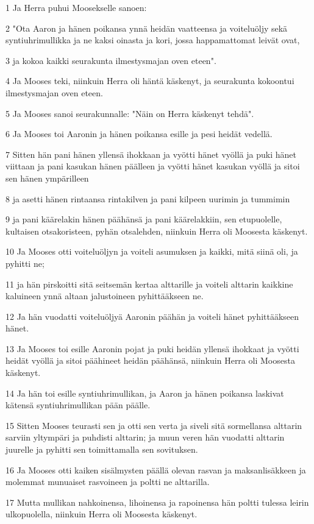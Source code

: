 \par 1 Ja Herra puhui Moosekselle sanoen:
\par 2 "Ota Aaron ja hänen poikansa ynnä heidän vaatteensa ja voiteluöljy sekä syntiuhrimullikka ja ne kaksi oinasta ja kori, jossa happamattomat leivät ovat,
\par 3 ja kokoa kaikki seurakunta ilmestysmajan oven eteen".
\par 4 Ja Mooses teki, niinkuin Herra oli häntä käskenyt, ja seurakunta kokoontui ilmestysmajan oven eteen.
\par 5 Ja Mooses sanoi seurakunnalle: "Näin on Herra käskenyt tehdä".
\par 6 Ja Mooses toi Aaronin ja hänen poikansa esille ja pesi heidät vedellä.
\par 7 Sitten hän pani hänen yllensä ihokkaan ja vyötti hänet vyöllä ja puki hänet viittaan ja pani kasukan hänen päälleen ja vyötti hänet kasukan vyöllä ja sitoi sen hänen ympärilleen
\par 8 ja asetti hänen rintaansa rintakilven ja pani kilpeen uurimin ja tummimin
\par 9 ja pani käärelakin hänen päähänsä ja pani käärelakkiin, sen etupuolelle, kultaisen otsakoristeen, pyhän otsalehden, niinkuin Herra oli Moosesta käskenyt.
\par 10 Ja Mooses otti voiteluöljyn ja voiteli asumuksen ja kaikki, mitä siinä oli, ja pyhitti ne;
\par 11 ja hän pirskoitti sitä seitsemän kertaa alttarille ja voiteli alttarin kaikkine kaluineen ynnä altaan jalustoineen pyhittääkseen ne.
\par 12 Ja hän vuodatti voiteluöljyä Aaronin päähän ja voiteli hänet pyhittääkseen hänet.
\par 13 Ja Mooses toi esille Aaronin pojat ja puki heidän yllensä ihokkaat ja vyötti heidät vyöllä ja sitoi päähineet heidän päähänsä, niinkuin Herra oli Moosesta käskenyt.
\par 14 Ja hän toi esille syntiuhrimullikan, ja Aaron ja hänen poikansa laskivat kätensä syntiuhrimullikan pään päälle.
\par 15 Sitten Mooses teurasti sen ja otti sen verta ja siveli sitä sormellansa alttarin sarviin yltympäri ja puhdisti alttarin; ja muun veren hän vuodatti alttarin juurelle ja pyhitti sen toimittamalla sen sovituksen.
\par 16 Ja Mooses otti kaiken sisälmysten päällä olevan rasvan ja maksanlisäkkeen ja molemmat munuaiset rasvoineen ja poltti ne alttarilla.
\par 17 Mutta mullikan nahkoinensa, lihoinensa ja rapoinensa hän poltti tulessa leirin ulkopuolella, niinkuin Herra oli Moosesta käskenyt.
